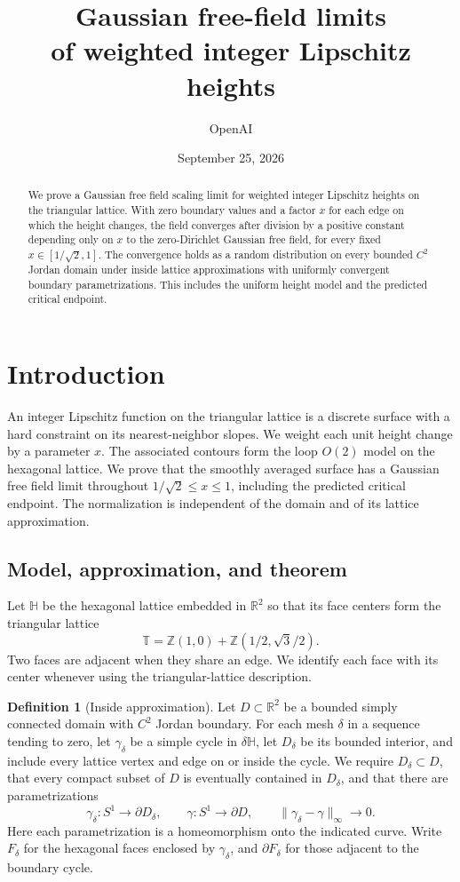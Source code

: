 \documentclass[11pt]{article}
\title{Gaussian free-field limits\\of weighted integer Lipschitz heights}
\author{OpenAI}
\date{September 25, 2026}
\theoremstyle{definition}
\newtheorem{definition}[theorem]{Definition}
\theoremstyle{remark}
\numberwithin{equation}{section}
\begin{document}
\begin{abstract}
We prove a Gaussian free field scaling limit for weighted integer Lipschitz
heights on the triangular lattice. With zero boundary values and a factor $x$
for each edge on which the height changes, the field converges after division
by a positive constant depending only on $x$ to the zero-Dirichlet Gaussian
free field, for every fixed $x\in[1/\sqrt2,1]$. The convergence holds as a
random distribution on every bounded $C^2$ Jordan domain under inside lattice
approximations with uniformly convergent boundary parametrizations. This
includes the uniform height model and the predicted critical endpoint.
\end{abstract}

\tableofcontents

\section{Introduction}\label{sec:introduction}

An integer Lipschitz function on the triangular lattice is a discrete
surface with a hard constraint on its nearest-neighbor slopes.  We weight
each unit height change by a parameter $x$.  The associated contours form
the loop $O(2)$ model on the hexagonal lattice.  We prove that the smoothly
averaged surface has a Gaussian free field limit throughout
$1/\sqrt2\le x\le1$, including the predicted critical endpoint.  The
normalization is independent of the domain and of its lattice approximation.

\subsection{Model, approximation, and theorem}

Let $\mathbb H$ be the hexagonal lattice embedded in $\mathbb R^2$ so that its face
centers form the triangular lattice
\[
 \mathbb T=\mathbb Z(1,0)+\mathbb Z(1/2,\sqrt3/2).
\]
Two faces are adjacent when they share an edge.  We identify each face with
its center whenever using the triangular-lattice description.

\begin{definition}[Inside approximation]\label{def:approximation}
Let $D\subset\mathbb R^2$ be a bounded simply connected domain with $C^2$ Jordan
boundary.  For each mesh $\delta$ in a sequence tending to zero, let
$\gamma_\delta$ be a simple cycle in $\delta\mathbb H$, let $D_\delta$ be its
bounded interior, and include every lattice vertex and edge on or inside
the cycle.  We require $D_\delta\subset D$, that every compact subset of
$D$ is eventually contained in $D_\delta$, and that there are
parametrizations
\[
 \gamma_\delta:S^1\longrightarrow\partial D_\delta,
 \qquad \gamma:S^1\longrightarrow\partial D,
 \qquad \|\gamma_\delta-\gamma\|_\infty\longrightarrow0.
\]
Here each parametrization is a homeomorphism onto the indicated curve.
Write $F_\delta$ for the hexagonal faces enclosed by $\gamma_\delta$, and
$\partial F_\delta$ for those adjacent to the boundary cycle.
\end{definition}
\end{document}
